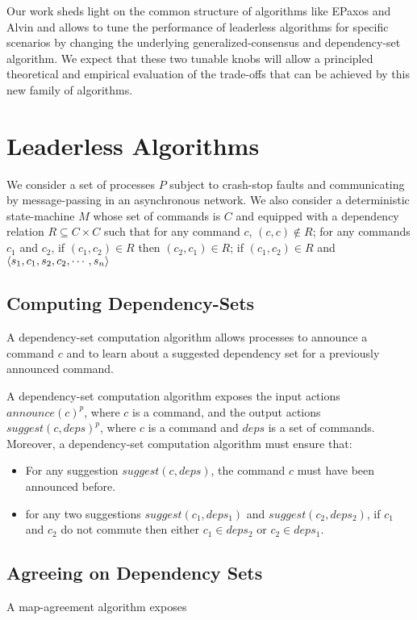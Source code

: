 Our work sheds light on the common structure of algorithms like EPaxos and Alvin and allows to tune the performance of leaderless algorithms for specific scenarios by changing the underlying generalized-consensus and dependency-set algorithm. 
We expect that these two tunable knobs will allow a principled theoretical and empirical evaluation of the trade-offs that can be achieved by this new family of algorithms.

\section{Leaderless Algorithms}

We consider a set of processes $P$ subject to crash-stop faults and communicating by message-passing in an asynchronous network.
We also consider a deterministic state-machine $M$ whose set of commands is $C$ and equipped with a dependency relation $R \subseteq C\times C$ such that for any command $c$, $\left( c,c \right)\notin R$; for any commands $c_1$ and $c_2$, if $\left( c_1,c_2 \right)\in R$ then $\left( c_2,c_1 \right)\in R$; if $\left( c_1,c_2 \right)\in R$ and $\left\langle s_1,c_1,s_2,c_2,\cdots,s_n\right\rangle$

\subsection{Computing Dependency-Sets}

A dependency-set computation algorithm allows processes to announce a command $c$ and to learn about a suggested dependency set for a previously announced command.

A dependency-set computation algorithm exposes the input actions ${announce\left( c \right)}^p$, where $c$ is a command, and the output actions ${suggest\left( c, deps \right)}^p$, where $c$ is a command and $deps$ is a set of commands.
Moreover, a dependency-set computation algorithm must ensure that:
\begin{itemize}[noitemsep,nolistsep]
    \item For any suggestion ${suggest\left( c, deps \right)}$, the command $c$ must have been announced before.
    \item for any two suggestions $suggest\left( c_1, deps_1 \right)$ and $suggest\left( c_2, deps_2 \right)$,  if $c_1$ and $c_2$ do not commute then either $c_1\in deps_2$ or $c_2 \in deps_1$.
\end{itemize}

\subsection{Agreeing on Dependency Sets}

A map-agreement algorithm exposes 

\printbibliography%


